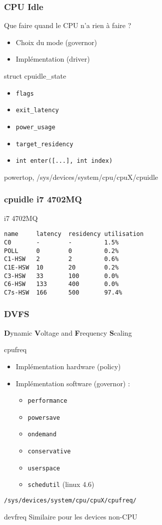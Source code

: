 \begin{frame}
	\frametitle{CPU Idle}
	\begin{block}{Que faire quand le CPU n'a rien à faire ?}
	\begin{itemize}
		\item Choix du mode (governor)
		\item Implémentation (driver)
	\end{itemize}
	\end{block}
	\begin{block}{struct cpuidle\_state}
		\begin{itemize}
			\item \texttt{flags}
			\item \texttt{exit\_latency}
			\item \texttt{power\_usage}
			\item \texttt{target\_residency}
			\item \texttt{int enter([...], int index)}
		\end{itemize}
	\end{block}
		powertop, /sys/devices/system/cpu/cpuX/cpuidle
\end{frame}

\begin{frame}[fragile]
	\frametitle{cpuidle i7 4702MQ}
	\begin{block}{i7 4702MQ}
\begin{verbatim}
name     latency  residency utilisation
C0       -        -         1.5%
POLL     0        0         0.2%
C1-HSW   2        2         0.6%
C1E-HSW  10       20        0.2%
C3-HSW   33       100       0.0%
C6-HSW   133      400       0.0%
C7s-HSW  166      500       97.4%
\end{verbatim}
		\end{block}
\end{frame}

\begin{frame}
	\frametitle{DVFS}
	\textbf{D}ynamic \textbf{V}oltage and \textbf{F}requency \textbf{S}caling
	\begin{block}{cpufreq}
		\begin{itemize}
			\item Implémentation hardware (policy)
			\item Implémentation software (governor) :
				\begin{itemize}
					\item \texttt{performance}
					\item \texttt{powersave}
					\item \texttt{ondemand}
					\item \texttt{conservative}
					\item \texttt{userspace}
					\item \texttt{schedutil} (linux 4.6)
				\end{itemize}
		\end{itemize}
		\texttt{/sys/devices/system/cpu/cpuX/cpufreq/}
	\end{block}
	\begin{block}{devfreq}
		Similaire pour les devices non-CPU
	\end{block}
\end{frame}

